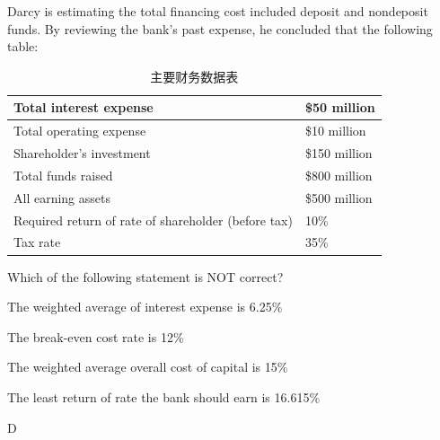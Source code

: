 \documentclass{article}
\newcounter{question} %
\begin{document}
\begin{question}
    Darcy is estimating the total financing cost included deposit and nondeposit funds. By reviewing the bank's past expense, he concluded that the following table:

    \begin{table}[htbp]
        \centering
        \begin{tabular}{|l|l|}
            \hline
            Total interest expense & \$50 million \\
            \hline
            Total operating expense & \$10 million \\
            \hline
            Shareholder's investment & \$150 million \\
            \hline
            Total funds raised & \$800 million \\
            \hline
            All earning assets & \$500 million \\
            \hline
            Required return of rate of shareholder (before tax) & 10\% \\
            \hline
            Tax rate & 35\% \\
            \hline
        \end{tabular}
        \caption{主要财务数据表}
    \end{table}

    Which of the following statement is NOT correct?
\end{question}

\begin{choices}
    \item The weighted average of interest expense is 6.25\%
    \item The break-even cost rate is 12\%
    \item The weighted average overall cost of capital is 15\%
    \item The least return of rate the bank should earn is 16.615\%
\end{choices}

\begin{correctanswer}
    D
\end{correctanswer}
\end{document}
